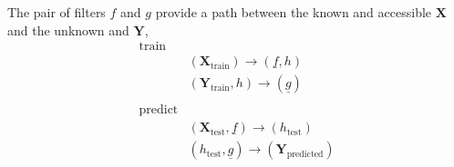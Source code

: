 \documentclass[12pt, a4paper, twoside,draft]{article}
\begin{document}
The pair of filters $f$ and $g$ provide a path between the known and accessible $\mathbf{X}$ and the unknown and $\mathbf{Y}$,
\begin{align}
  \textrm{train} & \nonumber\\
&  (\mathbf{X}_\textrm{train}) \rightarrow (\underline{f},h) \\
  & (\mathbf{Y}_\textrm{train}, h) \rightarrow(\underline{g}) \\
  \nonumber \\
  \textrm{predict} & \nonumber \\
  & (\mathbf{X}_\textrm{test}, \underline{f}) \rightarrow (h_\textrm{test})\\
&  (h_\textrm{test}, \underline{g}) \rightarrow (\mathbf{Y}_\textrm{predicted})
\end{align}
\end{document}
